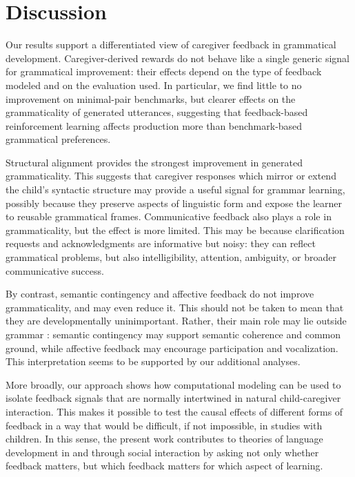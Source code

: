 \section{Discussion}
Our results support a differentiated view of caregiver feedback in grammatical development. Caregiver-derived rewards do not behave like a single generic signal for grammatical improvement: their effects depend on the type of feedback modeled and on the evaluation used. In particular, we find little to no improvement on minimal-pair benchmarks, but clearer effects on the grammaticality of generated utterances, suggesting that feedback-based reinforcement learning affects production more than benchmark-based grammatical preferences.

Structural alignment provides the strongest improvement in generated grammaticality. This suggests that caregiver responses which mirror or extend the child's syntactic structure may provide a useful signal for grammar learning, possibly because they preserve aspects of linguistic form and expose the learner to reusable grammatical frames. Communicative feedback also plays a role in grammaticality, but the effect is more limited. This may be because clarification requests and acknowledgments are informative but noisy: they can reflect grammatical problems, but also intelligibility, attention, ambiguity, or broader communicative success.

By contrast, semantic contingency and affective feedback do not improve grammaticality, and may even reduce it. This should not be taken to mean that they are developmentally uninimportant. Rather, their main role may lie outside grammar : semantic contingency may support semantic coherence and common ground, while affective feedback may encourage participation and vocalization. This interpretation seems to be supported by our additional analyses. 

More broadly, our approach shows how computational modeling can be used to isolate feedback signals that are normally intertwined in natural child-caregiver interaction. This makes it possible to test the causal effects of different forms of feedback in a way that would be difficult, if not impossible, in studies with children. In this sense, the present work contributes to theories of language development in and through social interaction by asking not only whether feedback matters, but which feedback matters for which aspect of learning. 

